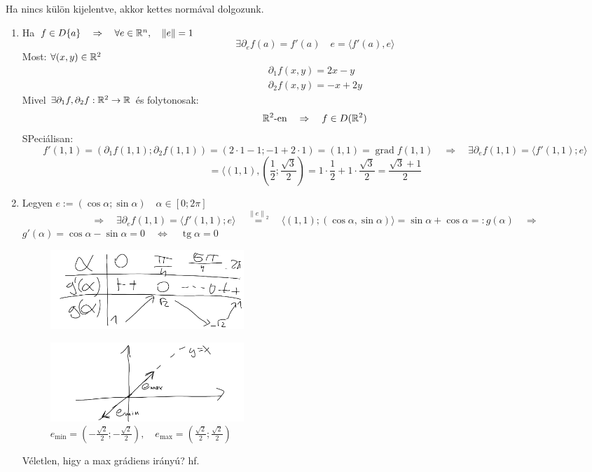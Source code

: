 \documentclass[a4paper,11.5pt]{article}
\DeclareMathOperator{\tg}{tg}
\DeclareMathOperator{\grad}{grad}
\newcommand{\norm}[1]{\left\lVert#1\right\rVert}
\begin{document}
	\begin{note}
		Ha nincs külön kijelentve, akkor kettes normával dolgozunk.
	\end{note}
	\begin{note}
		\begin{enumerate}
			\item Ha $f\in D\{a\}\quad \Rightarrow\quad \forall e\in\R^n,\quad \norm{e}=1$
			\[ \exists\partial_ef(a)=f'(a)\quad e=\langle f'(a),e\rangle \]
			Most: $\forall (x,y)\in\mathbb{R}^2$
			\begin{align*}
				\partial_1f(x,y)=2x-y\\
				\partial_2f(x,y)=-x+2y	
			\end{align*}
			Mivel $\exists\partial_1f, \partial_2f: \mathbb{R}^2\to\mathbb{R}$ és folytonosak:
			\[ \mathbb{R}^2\text{-en}\quad \Rightarrow\quad f\in D(\mathbb{R}^2) \]
			SPeciálisan:
			\[ f'(1,1)=(\partial_1f(1,1);\partial_2f(1,1))=(2\cdot1-1;-1+2\cdot1)=(1,1)=\grad f(1,1)\quad \Rightarrow\quad \exists\partial_ef(1,1)=\langle f'(1,1);e\rangle \]
			\[ =\langle(1,1),\left(\frac{1}{2};\frac{\sqrt{3}}{2}\right)=1\cdot\frac{1}{2}+1\cdot\frac{\sqrt{3}}{2}=\frac{\sqrt{3}+1}{2} \]
			\item Legyen $e:=(\cos\alpha; \sin\alpha)\quad \alpha\in[0;2\pi]$
			\[ \Rightarrow\quad \exists\partial_ef(1,1)=\langle f'(1,1);e\rangle\quad \overset{\norm{e}_2}{=}\quad \langle(1,1);(\cos\alpha,\sin\alpha)\rangle=\sin\alpha+\cos\alpha=:g(\alpha)\quad \Rightarrow \]
			$g'(\alpha)=\cos\alpha-\sin\alpha=0\quad \Leftrightarrow\quad \tg\alpha=0$
			\begin{figure}[H]
				\centering
				\includegraphics[height=3cm]{kepek/03.png}
				\caption{}
			\end{figure}
			\begin{figure}[H]
				\centering
				\includegraphics[height=3cm]{kepek/04.png}
				\caption{$e_{\min}= \left(-\frac{\sqrt{2}}{2};-\frac{\sqrt{2}}{2}\right),\quad e_{\max}= \left(\frac{\sqrt{2}}{2};\frac{\sqrt{2}}{2}\right)$}
			\end{figure}
			Véletlen, higy a max grádiens irányú? hf.
		\end{enumerate}
	\end{note}
\end{document}
